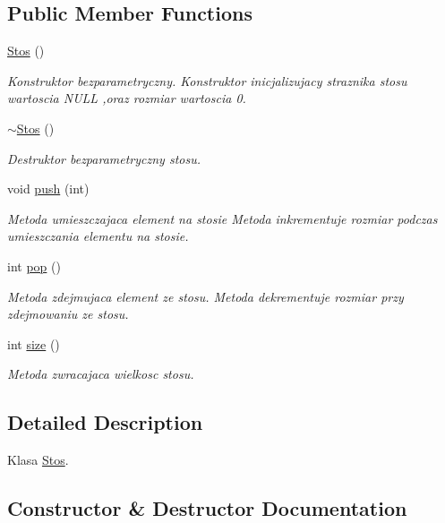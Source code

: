 \subsection*{Public Member Functions}
\begin{DoxyCompactItemize}
\item 
\hyperlink{a00016_a1de3b50386d5dfb56ddece17d0ea2389}{Stos} ()
\begin{DoxyCompactList}\small\item\em Konstruktor bezparametryczny. Konstruktor inicjalizujacy straznika stosu wartoscia N\+U\+L\+L ,oraz rozmiar wartoscia 0. \end{DoxyCompactList}\item 
\hyperlink{a00016_af9a198e2540e18adcc0b5259105fd78e}{$\sim$\+Stos} ()
\begin{DoxyCompactList}\small\item\em Destruktor bezparametryczny stosu. \end{DoxyCompactList}\item 
void \hyperlink{a00016_afe381df2afa35f3d122ca180300005dd}{push} (int)
\begin{DoxyCompactList}\small\item\em Metoda umieszczajaca element na stosie Metoda inkrementuje rozmiar podczas umieszczania elementu na stosie. \end{DoxyCompactList}\item 
int \hyperlink{a00016_aabb14b8a389c55da6e2b50fbb179ed56}{pop} ()
\begin{DoxyCompactList}\small\item\em Metoda zdejmujaca element ze stosu. Metoda dekrementuje rozmiar przy zdejmowaniu ze stosu. \end{DoxyCompactList}\item 
int \hyperlink{a00016_a696195d5125d9bbe6b491bc5985f9461}{size} ()
\begin{DoxyCompactList}\small\item\em Metoda zwracajaca wielkosc stosu. \end{DoxyCompactList}\end{DoxyCompactItemize}


\subsection{Detailed Description}
Klasa \hyperlink{a00016}{Stos}. 

\subsection{Constructor \& Destructor Documentation}
\hypertarget{a00016_a1de3b50386d5dfb56ddece17d0ea2389}{}
